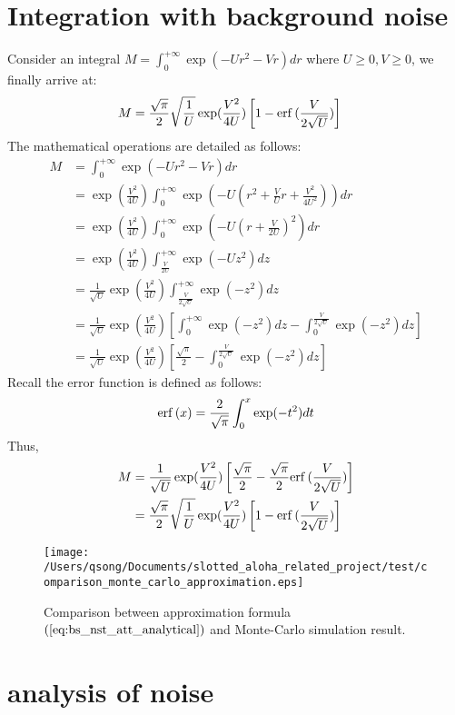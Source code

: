 \section*{Integration with background noise}
\label{annexe:integration-with-background-noise}
Consider an integral $M=\int_{0}^{+\infty} \exp(-Ur^{2}-Vr)  dr$ where $U \geq 0, V \geq 0$, we finally arrive at:
\begin{align}
M &= \frac{\sqrt{\pi}}{2} \sqrt{\frac{1}{U}}\exp(\frac{V^2}{4U})\left[ 1 - \mathrm{erf}\,(\frac{V}{2\sqrt{U}})\right]
\end{align}
The mathematical operations are detailed as follows:
\begin{align}
M &= \int_{0}^{+\infty} \exp(-Ur^{2}-Vr)  dr \nonumber\\
&= \exp(\frac{V^2}{4U})\int_{0}^{+\infty} \exp(-U(r^{2}+\frac{V}{U}r+\frac{V^2}{4U^2})) dr \nonumber\\
&=\exp(\frac{V^2}{4U})\int_{0}^{+\infty} \exp(-U(r+\frac{V}{2U})^2) dr\nonumber\\ 
&=\exp(\frac{V^2}{4U})\int_{\frac{V}{2U}}^{+\infty} \exp(-Uz^2) dz\nonumber\\ 
&=\frac{1}{\sqrt{U}}\exp(\frac{V^2}{4U})\int_{\frac{V}{2\sqrt{U}}}^{+\infty} \exp(-z^2) dz\nonumber\\
&=\frac{1}{\sqrt{U}}\exp(\frac{V^2}{4U})\left[\int_{0}^{+\infty} \exp(-z^2) dz - \int_{0}^{\frac{V}{2\sqrt{U}}} \exp(-z^2) dz\right] \nonumber\\  
&=\frac{1}{\sqrt{U}}\exp(\frac{V^2}{4U})\left[\frac{\sqrt{\pi}}{2}- \int_{0}^{\frac{V}{2\sqrt{U}}} \exp(-z^2) dz\right] 
\end{align}
Recall the error function is defined as follows:
\begin{align}
\mathrm{erf}\,(x) =\frac{2}{\sqrt{\pi}} \int_{0}^{x} \exp(-t^2) dt
\end{align}
Thus,
\begin{align}
M
&= \frac{1}{\sqrt{U}}\exp(\frac{V^2}{4U})\left[\frac{\sqrt{\pi}}{2} -\frac{\sqrt{\pi}}{2}\mathrm{erf}\,(\frac{V}{2\sqrt{U}}) \right] \nonumber\\
&= \frac{\sqrt{\pi}}{2} \sqrt{\frac{1}{U}}\exp(\frac{V^2}{4U})\left[ 1 - \mathrm{erf}\,(\frac{V}{2\sqrt{U}})\right]
\end{align}


\begin{figure}[!ht]
	\centering
	\texttt{[image: /Users/qsong/Documents/slotted\_aloha\_related\_project/test/comparison\_monte\_carlo\_approximation.eps]}
	\caption{Comparison between approximation formula $(\ref{eq:bs_nst_att_analytical})$ and Monte-Carlo simulation result.}
	\label{fig:comparison_monte_carlo}
\end{figure}


\section*{analysis of noise}
\label{annexe:analysis-background-noise}
